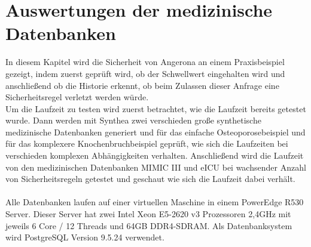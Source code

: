 \documentclass[german,version-2020-11]{uzl-thesis}
\begin{document}
\begin{figure}[ht]
\end{figure}

\chapter{Auswertungen der medizinische Datenbanken }\label{chap:Auswertung}
In diesem Kapitel wird die Sicherheit von Angerona an einem Praxisbeispiel gezeigt, indem zuerst geprüft wird, ob der Schwellwert eingehalten wird und anschließend ob die Historie erkennt, ob beim Zulassen dieser Anfrage eine Sicherheitsregel verletzt werden würde. \\ Um die Laufzeit zu testen wird zuerst betrachtet, wie die Laufzeit bereits getestet wurde. Dann werden mit Synthea zwei verschieden große synthetische medizinische Datenbanken generiert und  für das einfache Osteoporosebeispiel und für das komplexere Knochenbruchbeispiel geprüft, wie sich die Laufzeiten bei verschieden komplexen Abhängigkeiten verhalten. Anschließend wird die Laufzeit von den medizinischen Datenbanken MIMIC III und eICU bei wachsender Anzahl von Sicherheitsregeln getestet und geschaut wie sich die Laufzeit dabei verhält. \\ \\
Alle Datenbanken laufen auf einer virtuellen Maschine in einem PowerEdge R530 Server. Dieser Server hat zwei Intel Xeon E5-2620 v3 Prozessoren 2,4GHz mit jeweils 6 Core / 12 Threads und 64GB DDR4-SDRAM. Als Datenbanksystem wird PostgreSQL Version 9.5.24 verwendet. \\ 
\end{document}
